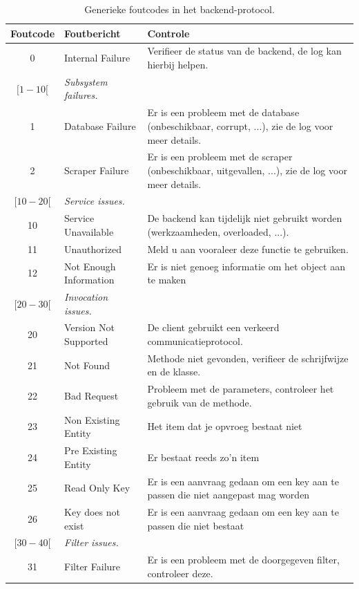 \begin{table}
\begin{tabular}{| c p{5cm} p{7cm} |}
	\hline
	Foutcode & Foutbericht & Controle \\
	\hline
	
	0 & Internal Failure & Verifieer de status van de backend, de log kan hierbij helpen. \\
	\hline
	
	$[1-10[$ & \emph{Subsystem failures.} & \\
	1 & Database Failure & Er is een probleem met de database (onbeschikbaar, corrupt, ...), zie de log voor meer details. \\
	2 & Scraper Failure & Er is een probleem met de scraper (onbeschikbaar, uitgevallen, ...), zie de log voor meer details. \\
	\hline
	
	$[10-20[$ & \emph{Service issues.} & \\
	10 & Service Unavailable & De backend kan tijdelijk niet gebruikt worden (werkzaamheden, overloaded, ...). \\
	11 & Unauthorized & Meld u aan vooraleer deze functie te gebruiken. \\
	12 & Not Enough Information & Er is niet genoeg informatie om het object aan te maken \\
	\hline
	
	$[20-30[$ & \emph{Invocation issues.} & \\
	20 & Version Not Supported & De client gebruikt een verkeerd communicatieprotocol. \\
	21 & Not Found & Methode niet gevonden, verifieer de schrijfwijze en de klasse. \\
	22 & Bad Request & Probleem met de parameters, controleer het gebruik van de methode. \\
	23 & Non Existing Entity & Het item dat je opvroeg bestaat niet \\
	24 & Pre Existing Entity & Er bestaat reeds zo'n item \\
	25 & Read Only Key & Er is een aanvraag gedaan om een key aan te passen die niet aangepast mag worden \\
	26 & Key does not exist & Er is een aanvraag gedaan om een key aan te passen die niet bestaat \\
	\hline

	$[30-40[$ & \emph{Filter issues.} & \\
	31 & Filter Failure & Er is een probleem met de doorgegeven filter, controleer deze. \\
	\hline
\end{tabular}
\caption{Generieke foutcodes in het backend-protocol.}
\end{table}

